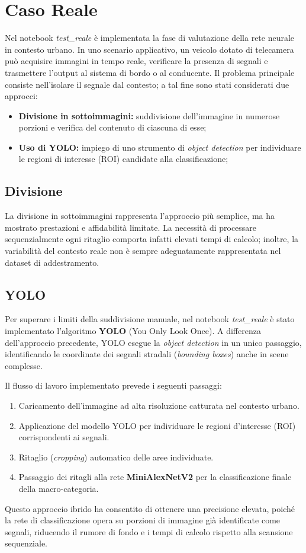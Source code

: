 \section{Caso Reale}
Nel notebook \textit{test\_reale} è implementata la fase di valutazione della rete neurale in contesto urbano. In uno scenario applicativo, un veicolo dotato di telecamera può acquisire immagini in tempo reale, verificare la presenza di segnali e trasmettere l'output al sistema di bordo o al conducente. Il problema principale consiste nell'isolare il segnale dal contesto; a tal fine sono stati considerati due approcci:

\begin{itemize}
    \item \textbf{Divisione in sottoimmagini:} suddivisione dell'immagine in numerose porzioni e verifica del contenuto di ciascuna di esse;
    \item \textbf{Uso di YOLO:} impiego di uno strumento di \textit{object detection} per individuare le regioni di interesse (ROI) candidate alla classificazione;
\end{itemize}

\subsection{Divisione}
La divisione in sottoimmagini rappresenta l'approccio più semplice, ma ha mostrato prestazioni e affidabilità limitate. La necessità di processare sequenzialmente ogni ritaglio comporta infatti elevati tempi di calcolo; inoltre, la variabilità del contesto reale non è sempre adeguatamente rappresentata nel dataset di addestramento.

\subsection{YOLO}
Per superare i limiti della suddivisione manuale, nel notebook \textit{test\_reale} è stato implementato l'algoritmo \textbf{YOLO} (You Only Look Once). A differenza dell'approccio precedente, YOLO esegue la \textit{object detection} in un unico passaggio, identificando le coordinate dei segnali stradali (\textit{bounding boxes}) anche in scene complesse.

Il flusso di lavoro implementato prevede i seguenti passaggi:
\begin{enumerate}
    \item Caricamento dell'immagine ad alta risoluzione catturata nel contesto urbano.
    \item Applicazione del modello YOLO per individuare le regioni d'interesse (ROI) corrispondenti ai segnali.
    \item Ritaglio (\textit{cropping}) automatico delle aree individuate.
    \item Passaggio dei ritagli alla rete \textbf{MiniAlexNetV2} per la classificazione finale della macro-categoria.
\end{enumerate}

Questo approccio ibrido ha consentito di ottenere una precisione elevata, poiché la rete di classificazione opera su porzioni di immagine già identificate come segnali, riducendo il rumore di fondo e i tempi di calcolo rispetto alla scansione sequenziale.
